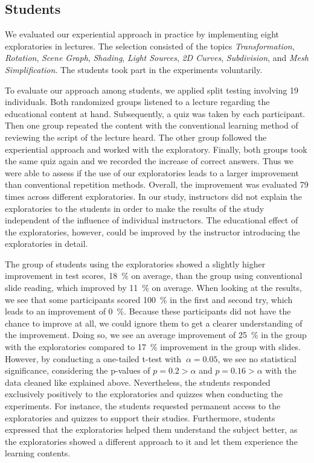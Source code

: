 \subsection{Students} %
We evaluated our experiential approach in practice by implementing eight exploratories in lectures. The selection consisted of the topics \textit{Transformation}, \textit{Rotation}, \textit{Scene Graph}, \textit{Shading}, \textit{Light Sources}, \textit{2D Curves}, \textit{Subdivision}, and \textit{Mesh Simplification}. The students took part in the experiments voluntarily.

To evaluate our approach among students, we applied split testing involving 19 individuals. Both randomized groups listened to a lecture regarding the educational content at hand. Subsequently, a quiz was taken by each participant. Then one group repeated the content with the conventional learning method of reviewing the script of the lecture heard. The other group followed the experiential approach and worked with the exploratory. Finally, both groups took the same quiz again and we recorded the increase of correct answers. Thus we were able to assess if the use of our exploratories leads to a larger improvement than conventional repetition methods. Overall, the improvement was evaluated 79 times across different exploratories. In our study, instructors did not explain the exploratories to the students in order to make the results of the study independent of the influence of individual instructors. The educational effect of the exploratories, however, could be improved by the instructor introducing the exploratories in detail.

The group of students using the exploratories showed a slightly higher improvement in test scores, 18~\% on average, than the group using conventional slide reading, which improved by 11~\% on average. When looking at the results, we see that some participants scored 100~\% in the first and second try, which leads to an improvement of 0~\%. Because these participants did not have the chance to improve at all, we could ignore them to get a clearer understanding of the improvement. Doing so, we see an average improvement of 25~\% in the group with the exploratories compared to 17~\% improvement in the group with slides. However, by conducting a one-tailed t-test with \(\ \alpha=0.05\), we see no statistical significance, considering the p-values of \(p=0.2>\alpha\) and \(p=0.16>\alpha\) with the data cleaned like explained above.
Nevertheless, the students responded exclusively positively to the exploratories and quizzes when conducting the experiments. For instance, the students requested permanent access to the exploratories and quizzes to support their studies. Furthermore, students expressed that the exploratories helped them understand the subject better, as the exploratories showed a different approach to it and let them experience the learning contents.

